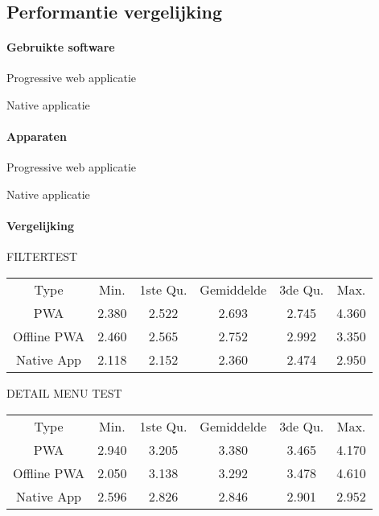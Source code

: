 
\chapter{}
\label{ch:methodologie}


\section{Performantie vergelijking}
\subsubsection{Gebruikte software}
Progressive web applicatie

Native applicatie

\subsubsection{Apparaten}
Progressive web applicatie

Native applicatie

\subsubsection{Vergelijking}

FILTERTEST
\begin{table}[]
	\begin{tabular}{cccccc}
		Type        & Min.  & 1ste Qu. & Gemiddelde & 3de Qu. & Max.  \\
		PWA         & 2.380 & 2.522    & 2.693      & 2.745   & 4.360 \\
		Offline PWA & 2.460 & 2.565    & 2.752      & 2.992   & 3.350 \\
		Native App  & 2.118 & 2.152    & 2.360      & 2.474   & 2.950 
	\end{tabular}
\end{table}



DETAIL MENU TEST
\begin{table}[]
	\begin{tabular}{cccccc}
		Type        & Min.  & 1ste Qu. & Gemiddelde & 3de Qu. & Max.  \\
		PWA         & 2.940 & 3.205    & 3.380      & 3.465   & 4.170 \\
		Offline PWA & 2.050 & 3.138    & 3.292      & 3.478   & 4.610 \\
		Native App  & 2.596 & 2.826    & 2.846      & 2.901   & 2.952
	\end{tabular}
\end{table}

